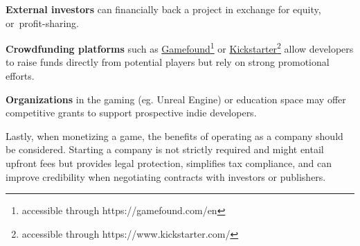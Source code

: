  \textbf{External investors} can financially back a project in exchange for equity, or~profit-sharing.\cite{perforce-stoftware_tips}

 \textbf{Crowdfunding platforms} such as \href{https://gamefound.com/en}{Gamefound}\footnote{accessible through https://gamefound.com/en} or \href{https://www.kickstarter.com/}{Kickstarter}\footnote{accessible through https://www.kickstarter.com/} allow developers to raise funds directly from potential players but rely on strong promotional efforts.\cite{perforce-stoftware_tips}

 \textbf{Organizations} in the gaming (eg. Unreal Engine) or education space may offer competitive grants to support prospective indie developers.\cite{perforce-stoftware_tips, unreal-engine_grants}

Lastly, when monetizing a game, the benefits of operating as a company should be considered. Starting a company is not strictly required and might entail upfront fees but provides legal protection, simplifies tax compliance, and can improve credibility when negotiating contracts with investors or publishers.\cite{expats_company-or-individual}